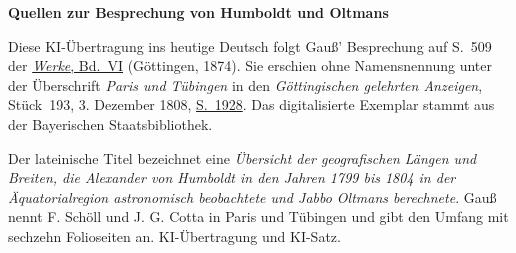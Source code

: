 \clearpage\thispagestyle{empty}
\begin{center}\textbf{Quellen zur Besprechung von Humboldt und Oltmans}\end{center}
\noindent Diese KI-Übertragung ins heutige Deutsch folgt Gauß’ Besprechung auf S.~509 der \href{https://gdz.sub.uni-goettingen.de/id/PPN236007467}{\textit{Werke}, Bd.~VI} (Göttingen, 1874). Sie erschien ohne Namensnennung unter der Überschrift \emph{Paris und Tübingen} in den \textit{Göttingischen gelehrten Anzeigen}, Stück~193, 3. Dezember 1808, \href{https://api.digitale-sammlungen.de/iiif/image/v2/bsb10538674_00922/full/1800,/0/default.jpg}{S.~1928}. Das digitalisierte Exemplar stammt aus der Bayerischen Staatsbibliothek.
\par\smallskip\noindent Der lateinische Titel bezeichnet eine \emph{Übersicht der geografischen Längen und Breiten, die Alexander von Humboldt in den Jahren 1799 bis 1804 in der Äquatorialregion astronomisch beobachtete und Jabbo Oltmans berechnete}. Gauß nennt F. Schöll und J. G. Cotta in Paris und Tübingen und gibt den Umfang mit sechzehn Folioseiten an. KI-Übertragung und KI-Satz.
\clearpage
